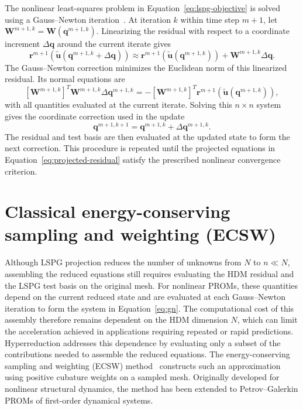 \documentclass[a4paper,12pt]{article}
\newcommand{\vect}[1]{\boldsymbol{#1}}
\newcommand{\matr}[1]{\boldsymbol{#1}}
\begin{document}
The nonlinear least-squares problem in Equation~\eqref{eq:lspg-objective} is solved using a Gauss--Newton iteration~\cite{carlberg2013gnat}. At iteration $k$ within time step $m+1$, let $\matr{W}^{m+1,k}=\matr{W}(\vect{q}^{m+1,k})$. Linearizing the residual with respect to a coordinate increment $\Delta\vect{q}$ around the current iterate gives
\begin{equation}
 \vect{r}^{m+1}\!\left(\widetilde{\vect{u}}(\vect{q}^{m+1,k}+\Delta\vect{q})\right)
 \approx\vect{r}^{m+1}\!\left(\widetilde{\vect{u}}(\vect{q}^{m+1,k})\right)
       +\matr{W}^{m+1,k}\Delta\vect{q}.
\end{equation}
The Gauss--Newton correction minimizes the Euclidean norm of this linearized residual. Its normal equations are
\begin{equation}
 \left[\matr{W}^{m+1,k}\right]^T\matr{W}^{m+1,k}
       \Delta\vect{q}^{m+1,k}
 =-\left[\matr{W}^{m+1,k}\right]^T
       \vect{r}^{m+1}\!\left(\widetilde{\vect{u}}(\vect{q}^{m+1,k})\right),
 \label{eq:gn}
\end{equation}
with all quantities evaluated at the current iterate. Solving this $n\times n$ system gives the coordinate correction used in the update
\begin{equation}
 \vect{q}^{m+1,k+1}
 =\vect{q}^{m+1,k}+\Delta\vect{q}^{m+1,k}.
\end{equation}
The residual and test basis are then evaluated at the updated state to form the next correction. This procedure is repeated until the projected equations in Equation~\eqref{eq:projected-residual} satisfy the prescribed nonlinear convergence criterion.


\section{Classical energy-conserving sampling and weighting (ECSW)}
\label{sec:ecsw}
\label{sec:meshes}

Although LSPG projection reduces the number of unknowns from $N$ to $n\ll N$, assembling the reduced equations still requires evaluating the HDM residual and the LSPG test basis on the original mesh. For nonlinear PROMs, these quantities depend on the current reduced state and are evaluated at each Gauss--Newton iteration to form the system in Equation~\eqref{eq:gn}. The computational cost of this assembly therefore remains dependent on the HDM dimension $N$, which can limit the acceleration achieved in applications requiring repeated or rapid predictions. Hyperreduction addresses this dependence by evaluating only a subset of the contributions needed to assemble the reduced equations. The energy-conserving sampling and weighting (ECSW) method~\cite{farhat2014dimensional,farhat2015structure,chapman2017accelerated,grimberg2021mesh} constructs such an approximation using positive cubature weights on a sampled mesh. Originally developed for nonlinear structural dynamics, the method has been extended to Petrov--Galerkin PROMs of first-order dynamical systems.
\end{document}
